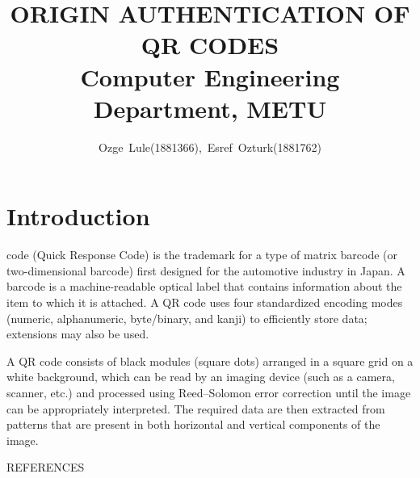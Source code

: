 \documentclass[12pt,journal,compsoc]{IEEEtran}
\begin{document}
\title{
	\huge ORIGIN AUTHENTICATION OF QR CODES \\
    \Large Computer Engineering Department, METU}


\author{\normalsize Ozge~Lule(1881366),~Esref~Ozturk(1881762)}




\maketitle

\IEEEdisplaynontitleabstractindextext

\IEEEpeerreviewmaketitle

\section{Introduction}

 code (Quick Response Code) is the trademark for a type of matrix barcode (or two-dimensional barcode) first designed for the automotive industry in Japan. A barcode is a machine-readable optical label that contains information about the item to which it is attached. A QR code uses four standardized encoding modes (numeric, alphanumeric, byte/binary, and kanji) to efficiently store data; extensions may also be used.

A QR code consists of black modules (square dots) arranged in a square grid on a white background, which can be read by an imaging device (such as a camera, scanner, etc.) and processed using Reed–Solomon error correction until the image can be appropriately interpreted. The required data are then extracted from patterns that are present in both horizontal and vertical components of the image.





\begin{thebibliography}{1}

REFERENCES

\end{thebibliography}
\end{document}
